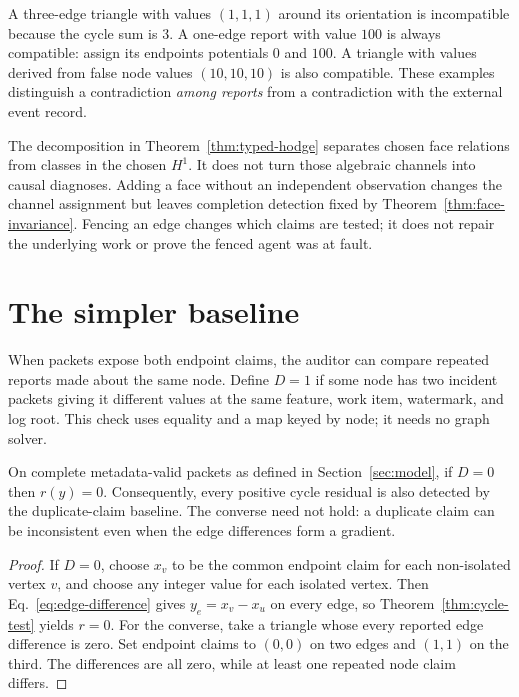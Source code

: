 \documentclass[11pt,a4paper]{article}
\begin{document}
A three-edge triangle with values $(1,1,1)$ around its orientation is incompatible because the cycle sum is $3$. A one-edge report with value $100$ is always compatible: assign its endpoints potentials $0$ and $100$. A triangle with values derived from false node values $(10,10,10)$ is also compatible. These examples distinguish a contradiction \emph{among reports} from a contradiction with the external event record.

The decomposition in Theorem~\ref{thm:typed-hodge} separates chosen face relations from classes in the chosen $H^1$. It does not turn those algebraic channels into causal diagnoses. Adding a face without an independent observation changes the channel assignment but leaves completion detection fixed by Theorem~\ref{thm:face-invariance}. Fencing an edge changes which claims are tested; it does not repair the underlying work or prove the fenced agent was at fault.

\section{The simpler baseline}\label{sec:baseline}
When packets expose both endpoint claims, the auditor can compare repeated reports made about the same node. Define $D=1$ if some node has two incident packets giving it different values at the same feature, work item, watermark, and log root. This check uses equality and a map keyed by node; it needs no graph solver.

\begin{theorem}\label{thm:duplicate-dominance}
On complete metadata-valid packets as defined in Section~\ref{sec:model}, if $D=0$ then $r(y)=0$. Consequently, every positive cycle residual is also detected by the duplicate-claim baseline. The converse need not hold: a duplicate claim can be inconsistent even when the edge differences form a gradient.
\end{theorem}
\begin{proof}
If $D=0$, choose $x_v$ to be the common endpoint claim for each non-isolated vertex $v$, and choose any integer value for each isolated vertex. Then Eq.~\ref{eq:edge-difference} gives $y_e=x_v-x_u$ on every edge, so Theorem~\ref{thm:cycle-test} yields $r=0$. For the converse, take a triangle whose every reported edge difference is zero. Set endpoint claims to $(0,0)$ on two edges and $(1,1)$ on the third. The differences are all zero, while at least one repeated node claim differs.
\end{proof}
\end{document}

